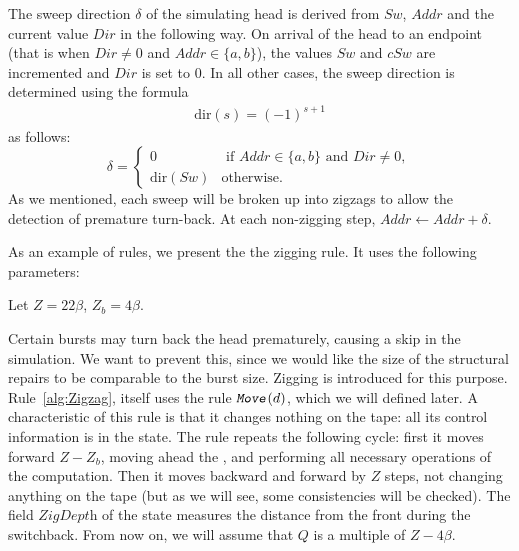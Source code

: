 \documentclass[12pt]{memoir}
\newcommand{\fld}[1]{\ensuremath{\textit{#1}}}
\newcommand{\rul}[1]{\ensuremath{\texttt{\slshape #1\/}}}
\newcommand{\Z}{Z}
\newcommand{\Addr}{\fld{Addr}}
\newcommand{\Dir}{\fld{Dir}}
\newcommand{\Sweep}{\fld{Sw}}
\newcommand{\cSweep}{\fld{cSw}}
\newcommand{\ZigDepth}{\fld{ZigDepth}}
\newcommand{\dir}{\mathrm{dir}}
\newcommand{\Move}{\rul{Move}}
\begin{document}
    The sweep direction $\delta$ of the simulating head is derived from
    $\Sweep$, $\Addr$ and the current value \( \Dir \) in the following way.
    On arrival of the head to an endpoint (that is
    when $\Dir \neq 0$ and $\Addr\in\{a,b\}$), the values
    $\Sweep$ and $\cSweep$ are incremented and $\Dir$ is set to 0.
    In all other cases, the sweep direction is determined
    using the formula
     \begin{align}\label{eq:sweep-dir}
       \dir(s)=(-1)^{s + 1}
     \end{align}
as follows: 
    \begin{equation}\label{eq:Dir}
    \delta =
      \begin{cases}
         0 & \text{ if $\Addr\in\{a,b\}$ and $\Dir\neq 0$},  \\
           \dir(\Sweep) &\text{otherwise}.
         \end{cases}
    \end{equation}
As we mentioned, each sweep will be broken up into zigzags to
allow the detection of premature turn-back.
At each non-zigging step, \( \Addr \gets \Addr+\delta \).

As an example of rules, we present the the zigging rule.
It uses the following parameters:

\begin{definition}\label{def:Z}
Let \( \Z=22\beta \), \( \Z_{b}=4\beta \).  %
\end{definition}

Certain bursts may turn back the head prematurely,
causing a skip in the simulation.
We want to prevent this, since we 
would like the size of the structural repairs to be comparable to the burst size.
Zigging is introduced for this purpose.
Rule~\ref{alg:Zigzag}, itself uses the rule \( \Move(d) \), which 
we will defined later.  %
A characteristic of this rule is that it changes nothing on the tape:
all its control information is in the state.
The rule repeats the following cycle: first it moves forward \( \Z-\Z_{b} \),
moving ahead the , and performing all necessary operations
of the computation.
Then it moves backward and forward by \( \Z \) steps, not changing anything
on the tape (but as we will see, some consistencies will be checked).
The field \( \ZigDepth \) of the state measures the distance from the front
during the switchback.
From now on, we will assume that \( Q \) is a multiple of \( \Z-4\beta \).

\end{document}
